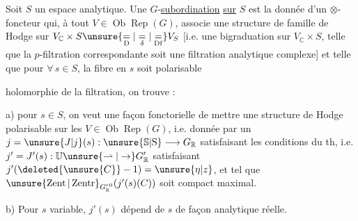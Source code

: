 
Soit $S$ un espace analytique. Une $G$-\uline{subordination}  \uline{sur} $S$ est la donnée d'un $\otimes$-foncteur qui, à tout $V\in\operatorname{Ob}\operatorname{Rep}(G)$, associe une structure de famille de Hodge  sur $V_{\mathbb{C}}\times S\unsure{\underset{\mathrm{D}}{=}|\underset{\delta}{=}|\underset{\mathrm{Df}}{=}}V_S$  [i.e. une bigraduation  sur $V_{\mathbb{C}}\times S$,  telle que la $p$-filtration correspondante soit une filtration analytique complexe] et telle que   pour  $\forall\,s\in S$, la fibre en $s$ soit polarisable 

 holomorphie de la filtration, on trouve :

a) pour   $s\in S$, on veut une façon  fonctorielle de mettre une structure de Hodge  polarisable sur les $V\in\operatorname{Ob}\operatorname{Rep}(G)$, i.e. donnée par un $j=\unsure{J|j}(s):\unsure{\mathbb{S}|\mathrm{S}}\longrightarrow G_{\mathbb{R}}$ satisfaisant les conditions du th, i.e. $j'=J'(s):\mathbb{U}\unsure{\rightharpoonup|\to}G'_{\mathbb{R}}$ satisfaisant $j'(\deleted{\unsure{C}}-1)=\unsure{\eta|z}$, et tel que $\unsure{\operatorname{Zent}|\operatorname{Zentr}}_{G_{\mathbb{R}}^{\prime\,0}}(j'(s)(C))$ soit compact maximal.

b) Pour $s$ variable, $j'(s)$ dépend de $s$ de façon analytique réelle.

